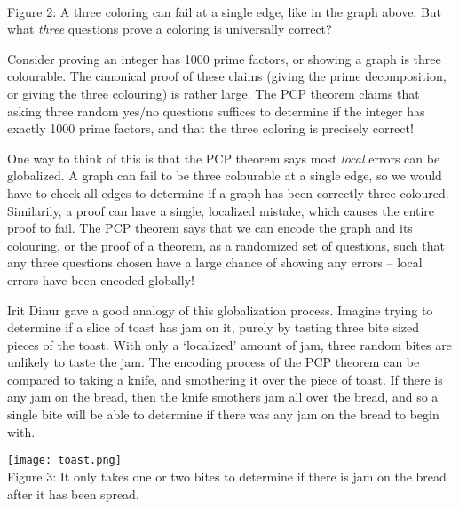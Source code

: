 \documentclass{article}
\theoremstyle{plain}
\theoremstyle{remark}
\theoremstyle{definition}
\begin{document}
\begin{multicols}{2}
\begin{center}
\\
{\small Figure 2: A three coloring can fail at a single edge, like in the graph above. But what {\it three} questions prove a coloring is universally correct?}
\end{center}

Consider proving an integer has 1000 prime factors, or showing a graph is three colourable. The canonical proof of these claims (giving the prime decomposition, or giving the three colouring) is rather large. The PCP theorem claims that asking three random yes/no questions suffices to determine if the integer has exactly 1000 prime factors, and that the three coloring is precisely correct!

 One way to think of this is that the PCP theorem says most {\it local} errors can be globalized. A graph can fail to be three colourable at a single edge, so we would have to check all edges to determine if a graph has been correctly three coloured. Similarily, a proof can have a single, localized mistake, which causes the entire proof to fail. The PCP theorem says that we can encode the graph and its colouring, or the proof of a theorem, as a randomized set of questions, such that any three questions chosen have a large chance of showing any errors -- local errors have been encoded globally!

Irit Dinur gave a good analogy of this globalization process. Imagine trying to determine if a slice of toast has jam on it, purely by tasting three bite sized pieces of the toast. With only a `localized' amount of jam, three random bites are unlikely to taste the jam. The encoding process of the PCP theorem can be compared to taking a knife, and smothering it over the piece of toast. If there is any jam on the bread, then the knife smothers jam all over the bread, and so a single bite will be able to determine if there was any jam on the bread to begin with.

\begin{center}
\texttt{[image: toast.png]}
\\
{\small Figure 3: It only takes one or two bites to determine if there is jam on the bread after it has been spread.}
\end{center}


\end{multicols}
\end{document}
